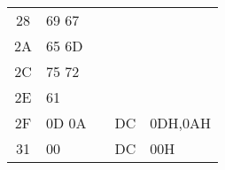 \begin{center}
{{\begin{description}
\begin{center}
{\begin{tabular}{|c|l|l|l l|}
28 &  69 67  &        &         &                \\
2A &  65 6D  &        &         &                \\
2C &  75 72  &        &         &                \\
2E &  61     &        &         &                \\
2F &  0D 0A  &        &  DC     & 0DH,0AH        \\
31 &  00     &        &  DC     & 00H            \\
\hline
\end{tabular}
}
\end{center}
\end{description}
}}
\end{center}

\newpage
